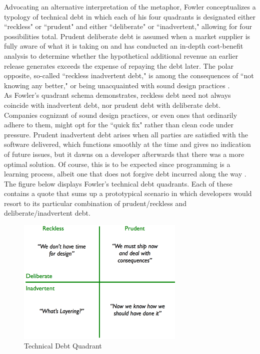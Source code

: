 Advocating an alternative interpretation of the metaphor, Fowler \cite{fowler} conceptualizes a typology of technical debt in which each of his four quadrants is designated either ``reckless" or ``prudent" and either ``deliberate" or ``inadvertent," allowing for four possibilities total. Prudent deliberate debt is assumed when a market supplier is fully aware of what it is taking on and has conducted an in-depth cost-benefit analysis to determine whether the hypothetical additional revenue an earlier release generates exceeds the expense of repaying the debt later. The polar opposite, so-called ``reckless inadvertent debt," is among the consequences of ``not knowing any better," or being unacquainted with sound design practices \cite{fowler}.\\
As Fowler's quadrant schema demonstrates, reckless debt need not always coincide with inadvertent debt, nor prudent debt with deliberate debt. Companies cognizant of sound design practices, or even ones that ordinarily adhere to them, might opt for the ``quick fix" rather than clean code under pressure. Prudent inadvertent debt arises when all parties are satisfied with the software delivered, which functions smoothly at the time and gives no indication of future issues, but it dawns on a developer afterwards that there was a more optimal solution. Of course, this is to be expected since programming is a learning process, albeit one that does not forgive debt incurred along the way \cite{fowler}.\\
The figure below displays Fowler's technical debt quadrants. Each of these contains a quote that sums up a prototypical scenario in which developers would resort to its particular combination of prudent/reckless and deliberate/inadvertent debt.

\begin{figure}[t]
	\centering
	\includegraphics[width=80mm]{figures/chapter2/technicalDebtQuadrant}
	\caption{Technical Debt Quadrant}
	\label{fig:technical_debt_quadrant}
\end{figure}


